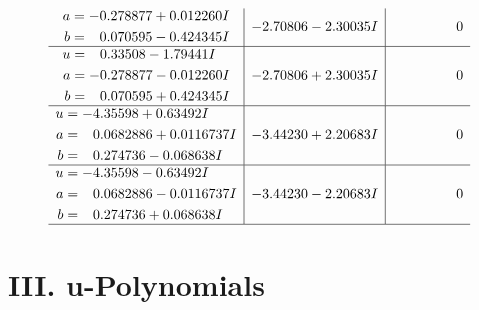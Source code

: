 \documentclass[1p]{elsarticle_modified}
\theoremstyle{definition}
\begin{document}
$$\begin{array}{c|c|c}
\begin{aligned}
a &= -0.278877 + 0.012260 I \\
b &= \phantom{-}0.070595 - 0.424345 I\end{aligned}
 & -2.70806 - 2.30035 I & \phantom{-0.000000 } 0 \\ \hline\begin{aligned}
u &= \phantom{-}0.33508 - 1.79441 I \\
a &= -0.278877 - 0.012260 I \\
b &= \phantom{-}0.070595 + 0.424345 I\end{aligned}
 & -2.70806 + 2.30035 I & \phantom{-0.000000 } 0 \\ \hline\begin{aligned}
u &= -4.35598 + 0.63492 I \\
a &= \phantom{-}0.0682886 + 0.0116737 I \\
b &= \phantom{-}0.274736 - 0.068638 I\end{aligned}
 & -3.44230 + 2.20683 I & \phantom{-0.000000 } 0 \\ \hline\begin{aligned}
u &= -4.35598 - 0.63492 I \\
a &= \phantom{-}0.0682886 - 0.0116737 I \\
b &= \phantom{-}0.274736 + 0.068638 I\end{aligned}
 & -3.44230 - 2.20683 I & \phantom{-0.000000 } 0\\
 \hline 
 \end{array}$$\newpage
\newpage\renewcommand{\arraystretch}{1}
\centering \section*{ III. u-Polynomials}
\end{document}
